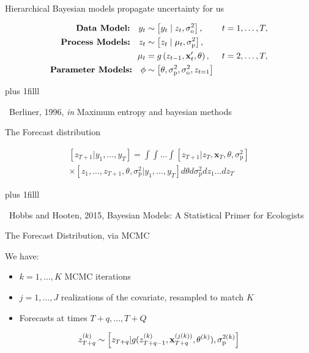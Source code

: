 \documentclass[12pt, compress, aspectratio=1610]{beamer}
\newcommand{\btVFill}{\vskip0pt plus 1filll}
\newcommand{\credit}[1]{\btVFill\par\hfill \footnotesize ~#1}
\begin{document}
\begin{frame}{%
\protect\hypertarget{hierarchical-bayesian-models-propagate-uncertainty-for-us}{%
Hierarchical Bayesian models propagate uncertainty for us}}

\begin{equation*}
\begin{aligned}[b]
\textbf{Data Model:} \quad y_t &\sim \left[y_t \;|\; z_t, \sigma^2_{\text{o}}\right], &t = 1,\dots,T, \\ 
\textbf{Process Models:} \quad z_t &\sim \left[z_t \;|\; \mu_t, \sigma^2_{\text{p}}\right],  \\ 
\mu_t &= g \left(z_{t-1},\textbf{x}'_t, \boldmath{\theta} \right), &t = 2,\dots,T, \\ 
\textbf{Parameter Models:} \quad \boldmath{\phi} &\sim \left[\boldmath{\theta},\sigma^2_{\text{p}},\sigma^2_{\text{o}},z_{t=1} \right]
\end{aligned}
\end{equation*}

\credit{Berliner, 1996, \emph{in} Maximum entropy and bayesian methods}

\end{frame}

\begin{frame}{%
\protect\hypertarget{the-forecast-distribution}{%
The Forecast distribution}}

\begin{equation*}
\begin{gathered}
\left[z_{T+1} | y_1,\dots,y_T \right] = \int \int \dots \int \left[z_{T+1} | z_T, \textbf{x}_T, \theta, \sigma^2_{\text{p}} \right] \\ \times \left[z_1,\dots,z_{T+1},\theta, \sigma^2_{\text{p}} | y_1,\dots,y_T \right] d \theta d \sigma^2_{\text{p}} d z_1 \dots d z_T
\end{gathered}
\end{equation*}

\credit{Hobbs and Hooten, 2015, Bayesian Models: A Statistical Primer for Ecologists}

\end{frame}

\begin{frame}{%
\protect\hypertarget{the-forecast-distribution-via-mcmc}{%
The Forecast Distribution, via MCMC}}

We have:

\begin{itemize}
 \item $k = 1,\dots,K$ MCMC iterations
 \item $j = 1,\dots,J$ realizations of the covariate, resampled to match $K$
 \item Forecasts at times $T+q,\dots,T+Q$
\end{itemize}

\begin{equation*}
z_{T+q}^{(k)} \sim \left[z_{T+q} | g(z_{T+q-1}^{(k)}, \textbf{x}_{T+q}^{(j(k))},\boldmath{\theta}^{(k)}), \sigma^{2(k)}_{\text{p}} \right]
\end{equation*}

\end{frame}
\end{document}
